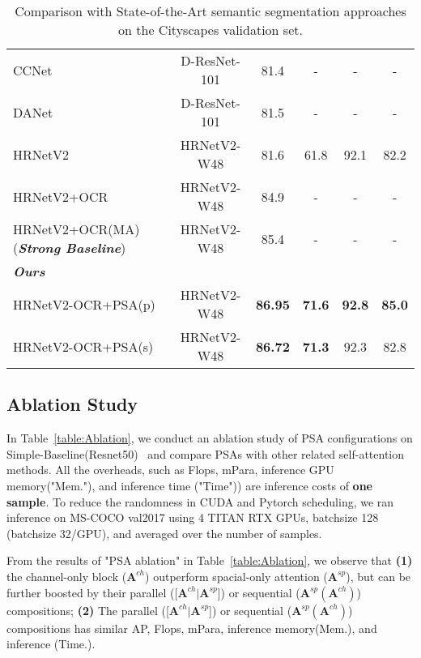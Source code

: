 \documentclass[10pt,twocolumn,letterpaper]{article}
\newcommand{\A}{\mathbf{A}}
\begin{document}
\begin{table*}[!htb]
\begin{tabular}{l|c|cccc}
CCNet~\cite{Huang2019} & D-ResNet-101 & 81.4 & - & - & -  \\
DANet~\cite{Fu2019} & D-ResNet-101 & 81.5 & - & - & -  \\
HRNetV2~\cite{Wang2020} & HRNetV2-W48 & 81.6 & 61.8 & 92.1 & 82.2 \\
HRNetV2+OCR~\cite{Yuan2020} & HRNetV2-W48 & 84.9 & - & - & -   \\
HRNetV2+OCR(MA)~\cite{Tao2020}  (\textbf{\textsl{Strong Baseline}}) & HRNetV2-W48 & 85.4 & - & - & -   \\
\hline
\textbf{\textit{Ours}}  &  & & & & \\
HRNetV2-OCR+PSA(p) & HRNetV2-W48 & \textbf{86.95}  &\textbf{71.6}  &\textbf{92.8}   &\textbf{85.0} \\
HRNetV2-OCR+PSA(s) & HRNetV2-W48 & \textbf{86.72}  &\textbf{71.3}  &92.3   &82.8 \\
\hline
\end{tabular}
\caption{Comparison with State-of-the-Art semantic segmentation approaches on the Cityscapes validation set. }
\label{table:CityscapesSOTA}
\end{table*}

\subsection{Ablation Study}

In Table~\ref{table:Ablation}, we conduct an ablation study of PSA configurations on Simple-Baseline(Resnet50)~\cite{Xiao18} and compare PSAs with other related self-attention methods. All the overheads, such as Flops, mPara, inference GPU memory("Mem."), and inference time ("Time")) are inference costs of \textbf{one sample}. To reduce the randomness in CUDA and Pytorch scheduling, we ran inference on MS-COCO val2017 using 4 TITAN RTX GPUs, batchsize 128 (batchsize 32/GPU), and averaged over the number of samples. 


From the results of "PSA ablation" in Table~\ref{table:Ablation}, we observe that \textbf{(1)} the channel-only block ($\A^{ch}$) outperform spacial-only attention ($\A^{sp}$), but can be further boosted by their parallel ([$\A^{ch}|\A^{sp}$]) or sequential ($\A^{sp}(\A^{ch})$) compositions; \textbf{(2)} The parallel ([$\A^{ch}|\A^{sp}$]) or sequential ($\A^{sp}(\A^{ch})$) compositions has similar AP, Flops, mPara, inference memory(Mem.), and inference (Time.).
\end{document}
